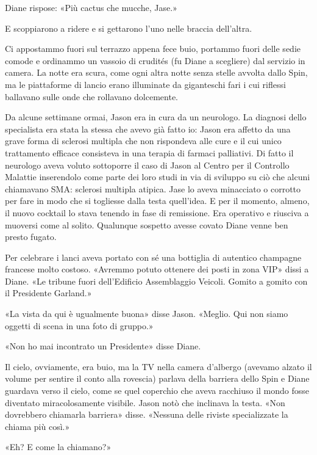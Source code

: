 Diane rispose: «Più cactus che mucche, Jase.»

E scoppiarono a ridere e si gettarono l'uno nelle braccia dell'altra.

\separatorefiori

Ci appostammo fuori sul terrazzo appena fece buio, portammo fuori delle
sedie comode e ordinammo un vassoio di crudités (fu Diane a scegliere)
dal servizio in camera. La notte era scura, come ogni altra notte senza
stelle avvolta dallo Spin, ma le piattaforme di lancio erano illuminate
da giganteschi fari i cui riflessi ballavano sulle onde che rollavano
dolcemente.

Da alcune settimane ormai, Jason era in cura da un neurologo. La
diagnosi dello specialista era stata la stessa che avevo già fatto io:
Jason era affetto da una grave forma di sclerosi multipla che non
rispondeva alle cure e il cui unico trattamento efficace consisteva in
una terapia di farmaci palliativi. Di fatto il neurologo aveva voluto
sottoporre il caso di Jason al Centro per il Controllo Malattie
inserendolo come parte dei loro studi in via di sviluppo su ciò che
alcuni chiamavano SMA: sclerosi multipla atipica. Jase lo aveva
minacciato o corrotto per fare in modo che si togliesse dalla testa
quell'idea. E per il momento, almeno, il nuovo cocktail lo stava tenendo
in fase di remissione. Era operativo e riusciva a muoversi come al
solito. Qualunque sospetto avesse covato Diane venne ben presto fugato.

Per celebrare i lanci aveva portato con sé una bottiglia di autentico
champagne francese molto costoso. «Avremmo potuto ottenere dei posti in
zona VIP» dissi a Diane. «Le tribune fuori dell'Edificio Assemblaggio
Veicoli. Gomito a gomito con il Presidente Garland.»

«La vista da qui è ugualmente buona» disse Jason. «Meglio. Qui non siamo
oggetti di scena in una foto di gruppo.»

«Non ho mai incontrato un Presidente» disse Diane.

Il cielo, ovviamente, era buio, ma la TV nella camera d'albergo (avevamo
alzato il volume per sentire il conto alla rovescia) parlava della
barriera dello Spin e Diane guardava verso il cielo, come se quel
coperchio che aveva racchiuso il mondo fosse diventato miracolosamente
visibile. Jason notò che inclinava la testa. «Non dovrebbero chiamarla
barriera» disse. «Nessuna delle riviste specializzate la chiama più
così.»

«Eh? E come la chiamano?»

